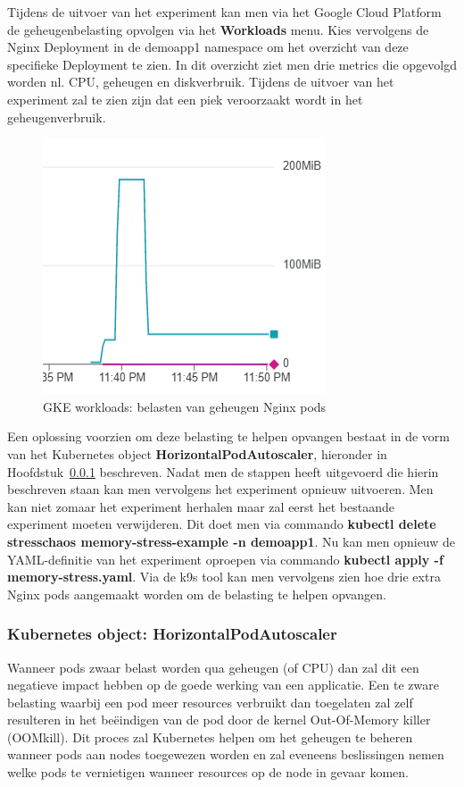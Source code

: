 Tijdens de uitvoer van het experiment kan men via het Google Cloud Platform de geheugenbelasting opvolgen via het {\bf Workloads} menu. Kies vervolgens de Nginx Deployment in de demoapp1 namespace om het overzicht van deze specifieke Deployment te zien. In dit overzicht ziet men drie metrics die opgevolgd worden nl. CPU, geheugen en diskverbruik. Tijdens de uitvoer van het experiment zal te zien zijn dat een piek veroorzaakt wordt in het geheugenverbruik.

\begin{figure}[h]
    \centering
    \includegraphics{img/nginx-memorystress.png}
    \caption{GKE workloads: belasten van geheugen Nginx pods}
\end{figure}

Een oplossing voorzien om deze belasting te helpen opvangen bestaat in de vorm van het Kubernetes object {\bf HorizontalPodAutoscaler}, hieronder in Hoofdstuk~\ref{subsec: HPA} beschreven. Nadat men de stappen heeft uitgevoerd die hierin beschreven staan kan men vervolgens het experiment opnieuw uitvoeren.
 Men kan niet zomaar het experiment herhalen maar zal eerst het bestaande experiment moeten verwijderen. Dit doet men via commando {\bf kubectl delete stresschaos memory-stress-example -n demoapp1}. Nu kan men opnieuw de YAML-definitie van het experiment oproepen via commando {\bf kubectl apply -f memory-stress.yaml}. Via de k9s tool kan men vervolgens zien hoe drie extra Nginx pods aangemaakt worden om de belasting te helpen opvangen. 

\subsubsection{Kubernetes object: HorizontalPodAutoscaler}
\label{subsec: HPA}
Wanneer pods zwaar belast worden qua geheugen (of CPU) dan zal dit een negatieve impact hebben op de goede werking van een applicatie. Een te zware belasting waarbij een pod meer resources verbruikt dan toegelaten zal zelf resulteren in het beëindigen van de pod door de kernel Out-Of-Memory killer (OOMkill). Dit proces zal Kubernetes helpen om het geheugen te beheren wanneer pods aan nodes toegewezen worden en zal eveneens beslissingen nemen welke pods te vernietigen wanneer resources op de node in gevaar komen. \autocite{Alletto2021} 


